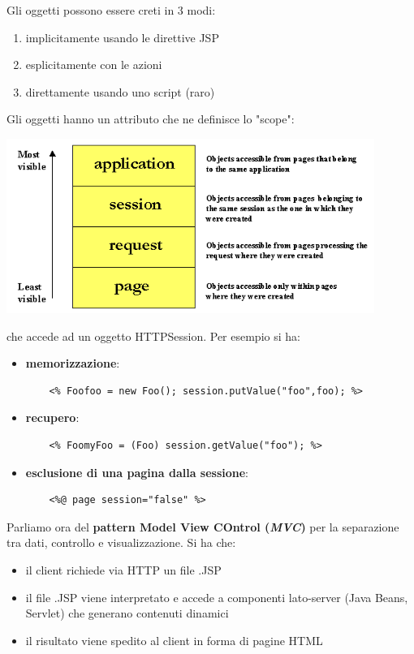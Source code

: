 \documentclass[a4paper,12pt, oneside]{book}
\begin{document}
Gli oggetti possono essere creti in 3 modi:
\begin{enumerate}
	\item implicitamente usando le direttive JSP
	\item esplicitamente con le azioni
	\item direttamente usando uno script (raro)
\end{enumerate}
Gli oggetti hanno un attributo che ne definisce lo "scope":
\begin{center}
	\includegraphics[scale=0.7]{img/scope.png}
\end{center}
che accede ad un oggetto HTTPSession. Per esempio si ha:
\begin{itemize}
	\item \textbf{memorizzazione}: 
	\begin{verbatim}
    <% Foofoo = new Foo(); session.putValue("foo",foo); %>
	\end{verbatim}
	\item \textbf{recupero}:
	\begin{verbatim}
    <% FoomyFoo = (Foo) session.getValue("foo"); %>
	\end{verbatim}
	\item \textbf{esclusione di una pagina dalla sessione}:
	\begin{verbatim}
    <%@ page session="false" %>
	\end{verbatim}
\end{itemize}
Parliamo ora del \textbf{pattern Model View COntrol (\textit{MVC})} per la separazione tra dati, controllo e visualizzazione. Si ha che:
\begin{itemize}
	\item il client richiede via HTTP un file .JSP
	\item il file .JSP viene interpretato e accede a componenti lato-server (Java Beans, Servlet) che generano contenuti dinamici  
	\item il risultato viene spedito al client in forma di pagine HTML 
\end{itemize}
\end{document}
